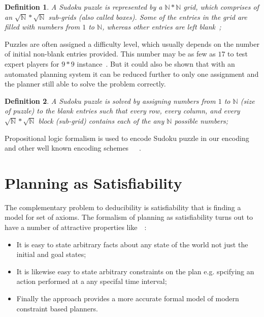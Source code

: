 \documentclass[letterpaper]{article}
\newtheorem{definition}{Definition}[section]
\begin{document}
\begin{definition} A Sudoku puzzle is represented by a $\mathbb{N}\ast\mathbb{N}$ grid, which comprises of an $\sqrt{\mathbb{N}} \ast \sqrt{\mathbb{N}}$ sub-grids (also called boxes). 
Some of the entries in the grid are filled with numbers from $1$ to $\mathbb{N}$, whereas other entries are left blank~\citet{Lynce2006};\end{definition}

Puzzles are often assigned a difficulty level, which usually depends on the number of initial non-blank entries provided. This number may be as few as $17$ to test expert players for $9\ast9$ instance~\citet{Lynce2006}. But it could also be shown that with an automated planning system it can be reduced further to only one assignment and the planner still able to solve the problem correctly.

\begin{definition} A Sudoku puzzle is solved by assigning numbers from $1$ to $\mathbb{N}$ (size of puzzle) to the blank entries such that every row, every column, and every $\sqrt{\mathbb{N}} \ast \sqrt{\mathbb{N}}$ block (sub-grid) contains each of the any $\mathbb{N}$ possible numbers;\end{definition} 

Propositional logic formalism is used to encode Sudoku puzzle in our encoding and other well known encoding schemes~\citet{Weber2005}~\citet{Lynce2006}~\citet{Gihwon2006}.

\section{Planning as Satisfiability}
The complementary problem to deducibility is satisfiability that is finding a model for set of axioms. The formalism of planning as satisfiability turns out to have a number of  attractive properties like~\citet{Stefik1981}~\citet{chapman1987}: 
\begin{itemize}
\item It is easy to state arbitrary facts about any state of the world not just the initial and goal states;
\item It is likewise easy to state arbitrary constraints on the plan e.g. spcifying an action performed at a any specifal time interval;
\item Finally the approach provides a more accurate formal model of modern constraint based planners.
\end{itemize}
\end{document}

